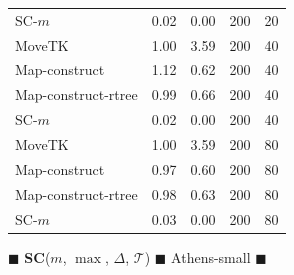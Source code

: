 \begin{figure}
\begin{center}
\begin{minipage}{0.5\textwidth}
\begin{tabular}{@{}lrrrr@{}}
        \medskip
SC-$m$ & 0.02 & 0.00 & 200 & 20\\
        MoveTK & 1.00 & 3.59 & 200 & 40\\
Map-construct & 1.12 & 0.62 & 200 & 40\\
Map-construct-rtree & 0.99 & 0.66 & 200 & 40\\
        \medskip
SC-$m$ & 0.02 & 0.00 & 200 & 40\\
        MoveTK & 1.00 & 3.59 & 200 & 80\\
Map-construct & 0.97 & 0.60 & 200 & 80\\
Map-construct-rtree & 0.98 & 0.63 & 200 & 80\\
        \medskip
SC-$m$ & 0.03 & 0.00 & 200 & 80\\
        \bottomrule
    \end{tabular}
\end{minipage}

        \caption{$\blacksquare$ \textbf{SC}($m$, $\max$, $\Delta$, $\mathcal{T}$) $\blacksquare$ Athens-small $\blacksquare$}

    \end{center} \end{figure}
